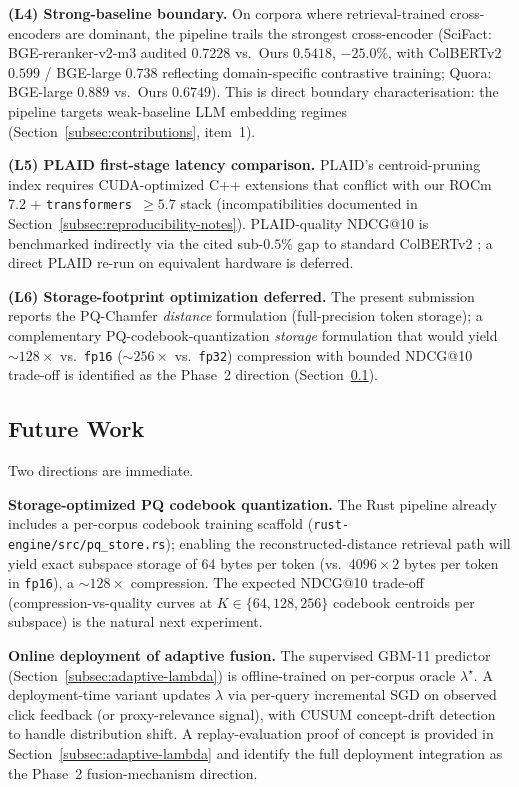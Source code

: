 \documentclass[review,1p]{elsarticle}
\begin{document}
\textbf{(L4) Strong-baseline boundary.} On corpora where retrieval-trained cross-encoders are dominant, the pipeline trails the strongest cross-encoder (SciFact: BGE-reranker-v2-m3 audited $0.7228$ vs.\ Ours $0.5418$, $-25.0\%$, with ColBERTv2 $0.599$ / BGE-large $0.738$ reflecting domain-specific contrastive training; Quora: BGE-large $0.889$ vs.\ Ours $0.6749$). This is direct boundary characterisation: the pipeline targets weak-baseline LLM embedding regimes (Section~\ref{subsec:contributions}, item~1).

\textbf{(L5) PLAID first-stage latency comparison.} PLAID's centroid-pruning index requires CUDA-optimized C++ extensions that conflict with our ROCm 7.2 + \texttt{transformers $\ge 5.7$} stack (incompatibilities documented in Section~\ref{subsec:reproducibility-notes}). PLAID-quality NDCG@10 is benchmarked indirectly via the cited sub-$0.5\%$ gap to standard ColBERTv2 \citep{santhanam2022colbertv2}; a direct PLAID re-run on equivalent hardware is deferred.

\textbf{(L6) Storage-footprint optimization deferred.} The present submission reports the PQ-Chamfer \emph{distance} formulation (full-precision token storage); a complementary PQ-codebook-quantization \emph{storage} formulation that would yield ${\sim}128\times$ vs.\ \texttt{fp16} ($\sim 256\times$ vs.\ \texttt{fp32}) compression with bounded NDCG@10 trade-off is identified as the Phase~2 direction (Section~\ref{subsec:future-work}).

\subsection{Future Work}
\label{subsec:future-work}

Two directions are immediate.

\textbf{Storage-optimized PQ codebook quantization.} The Rust pipeline already includes a per-corpus codebook training scaffold (\texttt{rust-engine/src/pq\_store.rs}); enabling the reconstructed-distance retrieval path will yield exact subspace storage of $64$ bytes per token (vs.\ $4096 \times 2$ bytes per token in \texttt{fp16}), a ${\sim}128\times$ compression. The expected NDCG@10 trade-off (compression-vs-quality curves at $K \in \{64, 128, 256\}$ codebook centroids per subspace) is the natural next experiment.

\textbf{Online deployment of adaptive fusion.} The supervised GBM-11 predictor (Section~\ref{subsec:adaptive-lambda}) is offline-trained on per-corpus oracle $\lambda^\star$. A deployment-time variant updates $\lambda$ via per-query incremental SGD on observed click feedback (or proxy-relevance signal), with CUSUM concept-drift detection to handle distribution shift. A replay-evaluation proof of concept is provided in Section~\ref{subsec:adaptive-lambda} and identify the full deployment integration as the Phase~2 fusion-mechanism direction.
\end{document}
